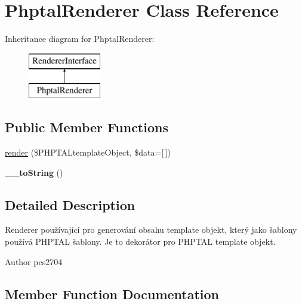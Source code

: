 \hypertarget{class_pes_1_1_view_1_1_renderer_1_1_phptal_renderer}{}\section{Phptal\+Renderer Class Reference}
\label{class_pes_1_1_view_1_1_renderer_1_1_phptal_renderer}
Inheritance diagram for Phptal\+Renderer\+:\begin{figure}[H]
\begin{center}
\leavevmode
\includegraphics[height=2.000000cm]{class_pes_1_1_view_1_1_renderer_1_1_phptal_renderer}
\end{center}
\end{figure}
\subsection*{Public Member Functions}
\begin{DoxyCompactItemize}
\item 
\mbox{\hyperlink{class_pes_1_1_view_1_1_renderer_1_1_phptal_renderer_a5742e3eb2df1f16f3cede8f0b8f02824}{render}} (\$P\+H\+P\+T\+A\+Ltemplate\+Object, \$data=\mbox{[}$\,$\mbox{]})
\item 
\mbox{\label{class_pes_1_1_view_1_1_renderer_1_1_phptal_renderer_a7516ca30af0db3cdbf9a7739b48ce91d}} 
{\bfseries \+\_\+\+\_\+to\+String} ()
\end{DoxyCompactItemize}


\subsection{Detailed Description}
Renderer používající pro generování obsahu template objekt, který jako šablony používá P\+H\+P\+T\+AL šablony. Je to dekorátor pro P\+H\+P\+T\+AL template objekt.

\begin{DoxyAuthor}{Author}
pes2704 
\end{DoxyAuthor}


\subsection{Member Function Documentation}
\mbox{\label{class_pes_1_1_view_1_1_renderer_1_1_phptal_renderer_a5742e3eb2df1f16f3cede8f0b8f02824}} 
